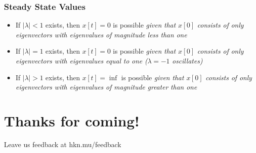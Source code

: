 \documentclass{beamer}
\begin{document}
\begin{frame}
\frametitle{Steady State Values}
\begin{itemize}
\item If $|\lambda | < 1$ exists, then $x[t] = 0$ is possible \textit{given that $x[0]$ consists of only eigenvectors with eigenvalues of magnitude less than one} \\
\item If $|\lambda | = 1$ exists, then $x[t] = 0$ is possible \textit{given that $x[0]$ consists of only eigenvectors with eigenvalues equal to one ($\lambda = -1$ oscillates)} \\
\item If $|\lambda | > 1$ exists, then $x[t] = \inf$ is possible \textit{given that $x[0]$ consists of only eigenvectors with eigenvalues of magnitude greater than one} \\
\end{itemize}

\end{frame}

\section*{Thanks for coming!}
Leave us feedback at hkn.mu/feedback
\end{document}
